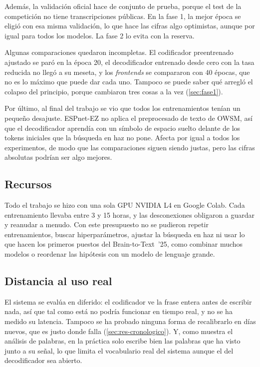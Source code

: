Además, la validación oficial hace de conjunto de prueba, porque el test de la competición no tiene transcripciones públicas. En la fase 1, la mejor época se eligió con esa misma validación, lo que hace las cifras algo optimistas, aunque por igual para todos los modelos. La fase 2 lo evita con la reserva.

Algunas comparaciones quedaron incompletas. El codificador preentrenado ajustado se paró en la época 20, el decodificador entrenado desde cero con la tasa reducida no llegó a su meseta, y los \textit{frontends} se compararon con 40 épocas, que no es lo máximo que puede dar cada uno. Tampoco se puede saber qué arregló el colapso del principio, porque cambiaron tres cosas a la vez (\cref{sec:fase1}).

Por último, al final del trabajo se vio que todos los entrenamientos tenían un pequeño desajuste. ESPnet-EZ no aplica el preprocesado de texto de OWSM, así que el decodificador aprendía con un símbolo de espacio suelto delante de los tokens iniciales que la búsqueda en haz no pone. Afecta por igual a todos los experimentos, de modo que las comparaciones siguen siendo justas, pero las cifras absolutas podrían ser algo mejores.

\subsection{Recursos}

Todo el trabajo se hizo con una sola GPU NVIDIA L4 en Google Colab. Cada entrenamiento llevaba entre 3 y 15 horas, y las desconexiones obligaron a guardar y reanudar a menudo. Con este presupuesto no se pudieron repetir entrenamientos, buscar hiperparámetros, ajustar la búsqueda en haz ni usar lo que hacen los primeros puestos del Brain-to-Text~'25, como combinar muchos modelos o reordenar las hipótesis con un modelo de lenguaje grande.

\subsection{Distancia al uso real}

El sistema se evalúa en diferido: el codificador ve la frase entera antes de escribir nada, así que tal como está no podría funcionar en tiempo real, y no se ha medido su latencia. Tampoco se ha probado ninguna forma de recalibrarlo en días nuevos, que es justo donde falla (\cref{sec:res-cronologico}). Y, como muestra el análisis de palabras, en la práctica solo escribe bien las palabras que ha visto junto a su señal, lo que limita el vocabulario real del sistema aunque el del decodificador sea abierto.

